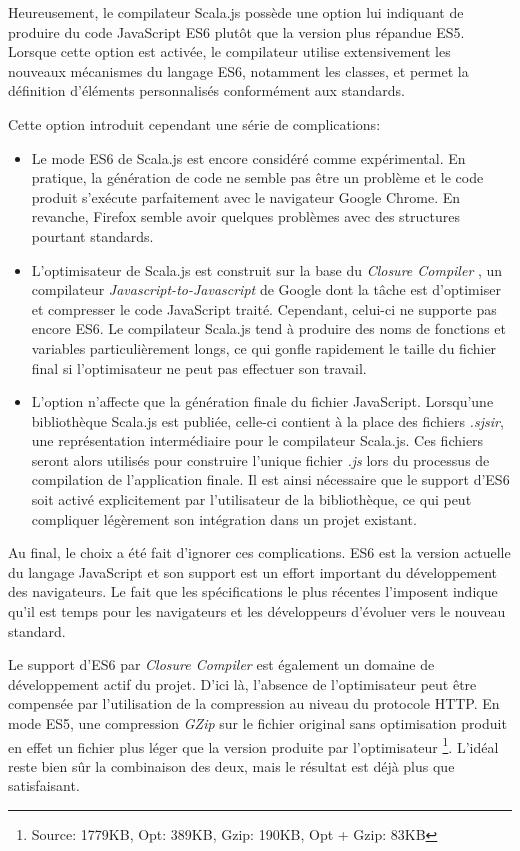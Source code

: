 Heureusement, le compilateur Scala.js possède une option lui indiquant de produire du code JavaScript ES6 plutôt que la version plus répandue ES5. Lorsque cette option est activée, le compilateur utilise extensivement les nouveaux mécanismes du langage ES6, notamment les classes, et permet la définition d'éléments personnalisés conformément aux standards.

Cette option introduit cependant une série de complications:

\begin{itemize}
	\item Le mode ES6 de Scala.js est encore considéré comme expérimental. En pratique, la génération de code ne semble pas être un problème et le code produit s'exécute parfaitement avec le navigateur Google Chrome. En revanche, Firefox semble avoir quelques problèmes avec des structures pourtant standards.
	\item L'optimisateur de Scala.js est construit sur la base du \emph{Closure Compiler} \cite{closure-compiler}, un compilateur \emph{Javascript-to-Javascript} de Google dont la tâche est d'optimiser et compresser le code JavaScript traité. Cependant, celui-ci ne supporte pas encore ES6. Le compilateur Scala.js tend à produire des noms de fonctions et variables particulièrement longs, ce qui gonfle rapidement le taille du fichier final si l'optimisateur ne peut pas effectuer son travail.
	\item L'option n'affecte que la génération finale du fichier JavaScript. Lorsqu'une bibliothèque Scala.js est publiée, celle-ci contient à la place des fichiers \emph{.sjsir}, une représentation intermédiaire pour le compilateur Scala.js. Ces fichiers seront alors utilisés pour construire l'unique fichier \emph{.js} lors du processus de compilation de l'application finale. Il est ainsi nécessaire que le support d'ES6 soit activé explicitement par l'utilisateur de la bibliothèque, ce qui peut compliquer légèrement son intégration dans un projet existant.
\end{itemize}

Au final, le choix a été fait d'ignorer ces complications. ES6 est la version actuelle du langage JavaScript et son support est un effort important du développement des navigateurs. Le fait que les spécifications le plus récentes l'imposent indique qu'il est temps pour les navigateurs et les développeurs d'évoluer vers le nouveau standard.

Le support d'ES6 par \emph{Closure Compiler} est également un domaine de développement actif du projet. D'ici là, l'absence de l'optimisateur peut être compensée par l'utilisation de la compression au niveau du protocole HTTP. En mode ES5, une compression \emph{GZip} sur le fichier original sans optimisation produit en effet un fichier plus léger que la version produite par l'optimisateur \footnote{Source: 1779KB, Opt: 389KB, Gzip: 190KB, Opt + Gzip: 83KB}. L'idéal reste bien sûr la combinaison des deux, mais le résultat est déjà plus que satisfaisant.

